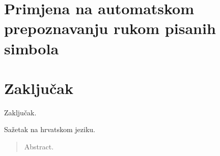 \documentclass[times, utf8, zavrsni, numeric]{fer}
\begin{document}
\chapter{Primjena na automatskom prepoznavanju rukom pisanih simbola}

\chapter{Zaključak}
Zaključak.





\begin{sazetak}
Sažetak na hrvatskom jeziku.

\end{sazetak}

\begin{abstract}
Abstract.

\end{abstract}
\end{document}
